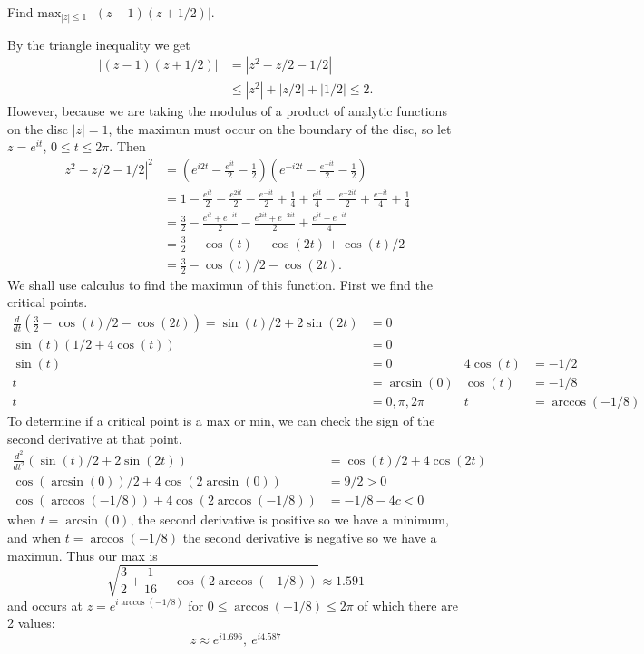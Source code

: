 \documentclass[12pt]{article}
\author{Warren Atkison}
\date{\today}
\newenvironment{exercise}[2][Exercise]{\begin{trivlist}
\item[\hskip \labelsep {\bfseries #1} \hskip \labelsep {\bfseries #2.}]}{\end{trivlist}}
\begin{document}
\fancyhf{}
\fancyhead[R]{\today}
\fancyfoot[R]{\thepage}

\begin{exercise}{17}
	Find $\text{max}_{|z| \le 1}$ $|(z-1)(z+1/2)|$.
\end{exercise}
By the triangle inequality we get
\begin{align*}
	\left|(z-1)\left(z+1/2\right)\right| &= \left|z^2 - z/2 - 1/2\right| \\
					     &\le  |z^2| + |z/2| + |1/2| \le 2.
\end{align*}
However, because we are taking the modulus of a product of analytic functions on the disc $|z| = 1$, the maximun must occur on the boundary of the disc, so let $z = e^{it}$, $0 \le t \le 2\pi$. Then
\begin{align*}
	\left|z^2 - z/2 - 1/2\right|^2 &= \left(e^{i2t} - \frac{e^{it}}{2} - \frac{1}{2}\right)\left(e^{-i2t} - \frac{e^{-it}}{2} - \frac{1}{2} \right) \\
				       &= 1 - \frac{e^{it}}{2} - \frac{e^{2it}}{2} - \frac{e^{-it}}{2} + \frac{1}{4} + \frac{e^{it}}{4} - \frac{e^{-2it}}{2} + \frac{e^{-it}}{4} + \frac{1}{4} \\
				       &= \frac{3}{2} - \frac{e^{it} + e^{-it}}{2} - \frac{e^{2it} + e^{-2it}}{2} + \frac{e^{it}+e^{-it}}{4} \\
				       &= \frac{3}{2} - \cos(t) - \cos(2t) + \cos(t)/2 \\
				       &= \frac{3}{2} - \cos(t)/2 - \cos(2t).
\end{align*}
We shall use calculus to find the maximun of this function. First we find the critical points.
\begin{align*}
	\frac{d}{dt}\left(\frac{3}{2} - \cos(t)/2 - \cos(2t)\right) = \sin(t)/2 + 2\sin(2t) &= 0 \\
	\sin(t)(1/2 + 4\cos(t)) &= 0 \\
	\sin(t) &= 0 & 4\cos(t) &= -1/2 \\
	t &= \arcsin(0) & \cos(t) &= -1/8 \\
	t &= 0,\pi,2\pi & t &= \arccos(-1/8)
\end{align*}
To determine if a critical point is a max or min, we can check the sign of the second derivative at that point.
\begin{align*}
	\frac{d^2}{dt^2} \left(\sin(t)/2 + 2\sin(2t)\right) &= \cos(t)/2 + 4\cos(2t) \\
	\cos(\arcsin(0))/2 + 4\cos(2\arcsin(0)) &= 9/2 > 0 \\
	\cos(\arccos(-1/8)) + 4\cos(2\arccos(-1/8)) &= -1/8 - 4c < 0
\end{align*}
when $t = \arcsin(0)$, the second derivative is positive so we have a minimum, and when $t = \arccos(-1/8)$ the second derivative is negative so we have a maximun. Thus our max is
\[
	\sqrt{\dfrac{3}{2} + \frac{1}{16} - \cos(2\arccos(-1/8))} \approx 1.591
\]
and occurs at $z = e^{i\arccos(-1/8)}$ for $0 \le \arccos(-1/8) \le 2\pi$ of which there are 2 values: $$z \approx e^{i1.696},~e^{i4.587}$$
\end{document}
